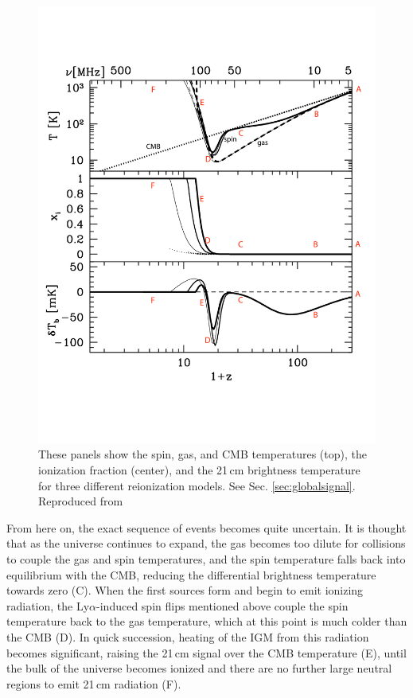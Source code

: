 \begin{figure}
	\centering
	\includegraphics[width=6in]{chap0_intro/pritchard_and_loeb_temperatures_annotated.pdf}
	\caption[The spin, gas, and CMB temperatures, the ionization fraction, and the 21\,cm brightness temperature for three different reionization models.]{These panels show the spin, gas, and CMB temperatures (top), the ionization fraction (center), and the 21\,cm brightness temperature for three different reionization models. See Sec. \ref{sec:globalsignal}. Reproduced from \citet{PritchardLoebReview}}
	\label{fig:pritchardloebtemperatures}
\end{figure}

From here on, the exact sequence of events becomes quite uncertain. It is thought that as the universe continues to expand, the gas becomes too dilute for collisions to couple the gas and spin temperatures, and the spin temperature falls back into equilibrium with the CMB, reducing the differential brightness temperature towards zero (C). When the first sources form and begin to emit ionizing radiation, the Ly$\alpha$-induced spin flips mentioned above couple the spin temperature back to the gas temperature, which at this point is much colder than the CMB (D). In quick succession, heating of the IGM from this radiation becomes significant, raising the 21\,cm signal over the CMB temperature (E), until the bulk of the universe becomes ionized and there are no further large neutral regions to emit 21\,cm radiation (F).

